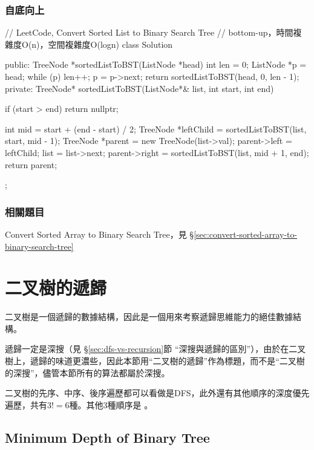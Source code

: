 \subsubsection{自底向上}
\begin{Code}
// LeetCode, Convert Sorted List to Binary Search Tree
// bottom-up，時間複雜度O(n)，空間複雜度O(logn)
class Solution {
public:
    TreeNode *sortedListToBST(ListNode *head) {
        int len = 0;
        ListNode *p = head;
        while (p) {
            len++;
            p = p->next;
        }
        return sortedListToBST(head, 0, len - 1);
    }
private:
    TreeNode* sortedListToBST(ListNode*& list, int start, int end) {
        if (start > end) return nullptr;

        int mid = start + (end - start) / 2;
        TreeNode *leftChild = sortedListToBST(list, start, mid - 1);
        TreeNode *parent = new TreeNode(list->val);
        parent->left = leftChild;
        list = list->next;
        parent->right = sortedListToBST(list, mid + 1, end);
        return parent;
    }
};
\end{Code}


\subsubsection{相關題目}
\begindot
\item Convert Sorted Array to Binary Search Tree，見 \S \ref{sec:convert-sorted-array-to-binary-search-tree}
\myenddot


\section{二叉樹的遞歸} %
二叉樹是一個遞歸的數據結構，因此是一個用來考察遞歸思維能力的絕佳數據結構。

遞歸一定是深搜（見 \S \ref{sec:dfs-vs-recursion}節 “深搜與遞歸的區別”），由於在二叉樹上，遞歸的味道更濃些，因此本節用“二叉樹的遞歸”作為標題，而不是“二叉樹的深搜”，儘管本節所有的算法都屬於深搜。

二叉樹的先序、中序、後序遍歷都可以看做是DFS，此外還有其他順序的深度優先遍歷，共有$3!=6$種。其他3種順序是 。


\subsection{Minimum Depth of Binary Tree}
\label{sec:minimum-depth-of-binary-tree}


